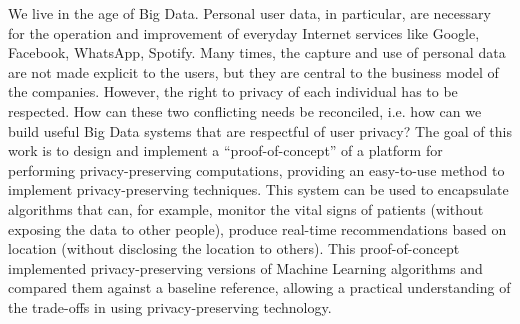 We live in the age of Big Data. Personal user data, in particular, are necessary for the operation and improvement of everyday Internet services like Google, Facebook, WhatsApp, Spotify. Many times, the capture and use of personal data are not made explicit to the users, but they are central to the business model of the companies. However, the right to privacy of each individual has to be respected.
How can these two conflicting needs be reconciled, i.e. how can we build useful Big Data systems that are respectful of user privacy?
The goal of this work is to design and implement a ``proof-of-concept'' of a platform for performing privacy-preserving computations, providing an easy-to-use method to implement privacy-preserving techniques. This system can be used to encapsulate algorithms that can, for example, monitor the vital signs of patients (without exposing the data to other people), produce real-time recommendations based on location (without disclosing the location to others).
This proof-of-concept implemented privacy-preserving versions of Machine Learning algorithms and compared them against a baseline reference, allowing a practical understanding of the trade-offs in using privacy-preserving technology.

\newpage
